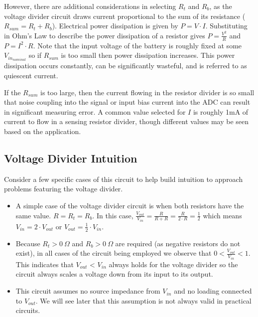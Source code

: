 \documentclass[main.tex]{subfiles}
\begin{document}
\newnoindentpara However, there are additional considerations in selecting $R_t$ and $R_b$, as the voltage divider circuit draws current proportional to the sum of its resistance ($R_{sum} = R_{t} + R_{b}$). Electrical power dissipation is given by $P = V \cdot I$. Substituting in Ohm's Law to describe the power dissipation of a resistor gives $P = \frac{V^2}{R}$ and $P = I^{2} \cdot R$. Note that the input voltage of the battery is roughly fixed at some $V_{in_{nominal}}$ so if $R_{sum}$ is too small then power dissipation increases. This power dissipation occurs constantly, can be significantly wasteful, and is referred to as quiescent current. \newline

\newnoindentpara If the $R_{sum}$ is too large, then the current flowing in the resistor divider is so small that noise coupling into the signal or input bias current into the ADC can result in significant measuring error. A common value selected for $I$ is roughly 1mA of current to flow in a sensing resistor divider, though different values may be seen based on the application.

\subsection{Voltage Divider Intuition}
Consider a few specific cases of this circuit to help build intuition to approach problems featuring the voltage divider.
\begin{itemize}
    \item A simple case of the voltage divider circuit is when both resistors have the same value. $R = R_t = R_b$. In this case, $\frac{V_{out}}{V_{in}} = \frac{R}{R+R} = \frac{R}{2 \cdot R} = \frac{1}{2}$ which means $V_{in} = 2 \cdot V_{out}$ or $V_{out} = \frac{1}{2} \cdot V_{in}$.
    \item Because $R_t > 0 \ \Omega$ and $R_b > 0 \ \Omega$ are required (as negative resistors do not exist), in all cases of the circuit being employed we observe that $0 < \frac{V_{out}}{V_{in}} < 1$. This indicates that $V_{out}$ < $V_{in}$ always holds for the voltage divider so the circuit always scales a voltage down from its input to its output.
    \item This circuit assumes no source impedance from $V_{in}$ and no loading connected to $V_{out}$. We will see later that this assumption is not always valid in practical circuits. 
\end{itemize}
\end{document}

